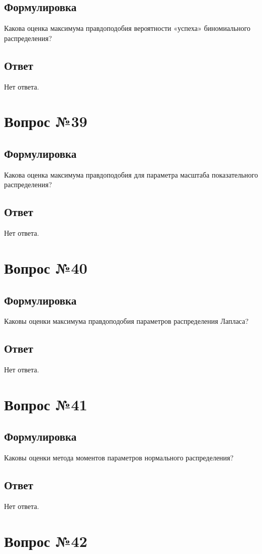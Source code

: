 \documentclass[a4]{article}
\begin{document}
	\subsection*{Формулировка}
	Какова оценка максимума правдоподобия вероятности «успеха» биномиального
распределения?
	\subsection*{Ответ}
	Нет ответа.
	
	\section{Вопрос №39}
	\subsection*{Формулировка}
	Какова оценка максимума правдоподобия для параметра масштаба показательного
распределения?
	\subsection*{Ответ}
	Нет ответа.
	
	\section{Вопрос №40}
	\subsection*{Формулировка}
	Каковы оценки максимума правдоподобия параметров распределения Лапласа?
	\subsection*{Ответ}
	Нет ответа.
	
	\section{Вопрос №41}
	\subsection*{Формулировка}
	Каковы оценки метода моментов параметров нормального распределения?
	\subsection*{Ответ}
	Нет ответа.
	
	\section{Вопрос №42}
\end{document}
